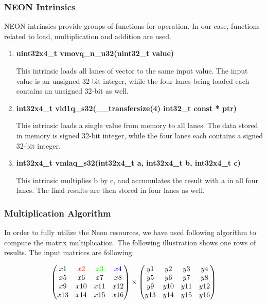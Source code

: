 \subsubsection{NEON Intrinsics}
NEON intrinsics \cite{Intrinsics} provide groups of functions for operation. 
In our case, functions related to load, multiplication and addition are used. 
\begin{enumerate}
\item \textbf{uint32x4\_t  vmovq\_n\_u32(uint32\_t value)}

This intrinsic loads all lanes of vector to the same input value. 
The input value is an unsigned 32-bit integer, 
while the four lanes being loaded each contains an unsigned 32-bit as well.


\item \textbf{int32x4\_t   vld1q\_s32(\_\_transfersize(4) int32\_t const * ptr)}

This intrinsic loads a single value from memory to all lanes.
The data stored in memory is signed 32-bit integer, 
while the four lanes each contains a signed 32-bit integer.

\item \textbf{int32x4\_t   vmlaq\_s32(int32x4\_t a, int32x4\_t b, int32x4\_t c)}

This intrinsic multiplies b by c, and accumulates the result with a in all four lanes.
The final results are then stored in four lanes as well.
\end{enumerate}

\subsubsection{Multiplication Algorithm}

In order to fully utilize the Neon resources, we have used following algorithm to compute the matrix multiplication. The following illustration shows one rows of results.
The input matrices are following:

$$
\begin{pmatrix}
 x1 	& \color{red}{x2} 	& \color{green}{x3} & \color{blue}{x4}\\
 x5 	& x6 				& x7&x8\\
 x9 	& x10 				& x11&x12\\
 x13 	& x14 				& x15&x16\\
\end{pmatrix}
\times
\begin{pmatrix}
y1&y2&y3&y4\\
y5&y6&y7&y8\\
y9&y10&y11&y12\\
y13&y14&y15&y16\\
\end{pmatrix}
$$


